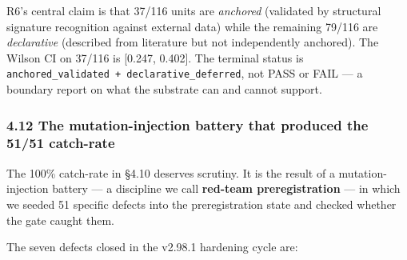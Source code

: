 \documentclass[
]{article}
\begin{document}
R6's central claim is that 37/116 units are \emph{anchored} (validated
by structural signature recognition against external data) while the
remaining 79/116 are \emph{declarative} (described from literature but
not independently anchored). The Wilson CI on 37/116 is {[}0.247,
0.402{]}. The terminal status is
\texttt{anchored\_validated\ +\ declarative\_deferred}, not PASS or FAIL
--- a boundary report on what the substrate can and cannot support.

\subsubsection{4.12 The mutation-injection battery that produced the
51/51
catch-rate}\label{the-mutation-injection-battery-that-produced-the-5151-catch-rate}

The 100\% catch-rate in §4.10 deserves scrutiny. It is the result of a
mutation-injection battery --- a discipline we call \textbf{red-team
preregistration} --- in which we seeded 51 specific defects into the
preregistration state and checked whether the gate caught them.

The seven defects closed in the v2.98.1 hardening cycle are:
\end{document}
